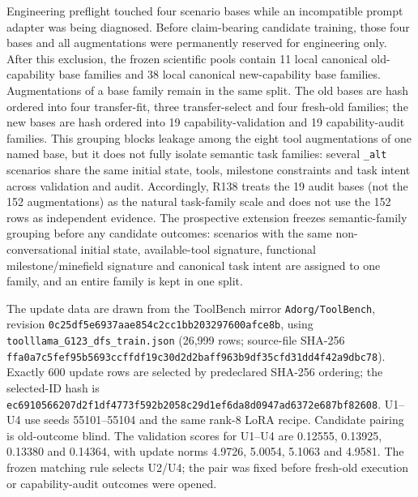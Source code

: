 \documentclass[11pt,letterpaper]{article}
\theoremstyle{plain}
\newcommand{\1}{\mathbf 1}
\begin{document}
Engineering preflight touched four scenario bases while an incompatible prompt adapter was being diagnosed. Before claim-bearing candidate training, those four bases and all augmentations were permanently reserved for engineering only. After this exclusion, the frozen scientific pools contain 11 local canonical old-capability base families and 38 local canonical new-capability base families. Augmentations of a base family remain in the same split. The old bases are hash ordered into four transfer-fit, three transfer-select and four fresh-old families; the new bases are hash ordered into 19 capability-validation and 19 capability-audit families. This grouping blocks leakage among the eight tool augmentations of one named base, but it does not fully isolate semantic task families: several \texttt{\_alt} scenarios share the same initial state, tools, milestone constraints and task intent across validation and audit. Accordingly, R138 treats the 19 audit bases (not the 152 augmentations) as the natural task-family scale and does not use the 152 rows as independent evidence. The prospective extension freezes semantic-family grouping before any candidate outcomes: scenarios with the same non-conversational initial state, available-tool signature, functional milestone/minefield signature and canonical task intent are assigned to one family, and an entire family is kept in one split.

The update data are drawn from the ToolBench mirror \texttt{Adorg/ToolBench}, revision \nolinkurl{0c25df5e6937aae854c2cc1bb203297600afce8b}, using \nolinkurl{toolllama_G123_dfs_train.json} (26,999 rows; source-file SHA-256 \nolinkurl{ffa0a7c5fef95b5693ccffdf19c30d2d2baff963b9df35cfd31dd4f42a9dbc78}). Exactly 600 update rows are selected by predeclared SHA-256 ordering; the selected-ID hash is \nolinkurl{ec6910566207d2f1df4773f592b2058c29d1ef6da8d0947ad6372e687bf82608}. U1--U4 use seeds 55101--55104 and the same rank-8 LoRA recipe. Candidate pairing is old-outcome blind. The validation scores for U1--U4 are 0.12555, 0.13925, 0.13380 and 0.14364, with update norms 4.9726, 5.0054, 5.1063 and 4.9581. The frozen matching rule selects U2/U4; the pair was fixed before fresh-old execution or capability-audit outcomes were opened.
\end{document}
